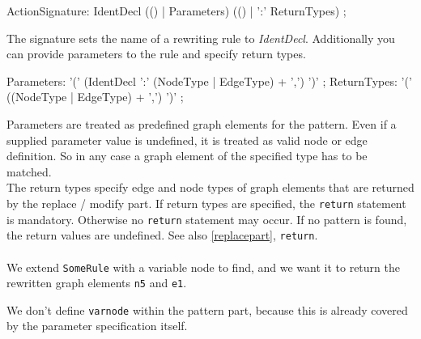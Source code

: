 \begin{rail}  
  ActionSignature: IdentDecl (() | Parameters) (() | ':' ReturnTypes) ;
\end{rail}
The signature sets the name of a rewriting rule to \emph{IdentDecl}. Additionally you can provide parameters to the rule and specify return types.

\begin{rail}
  Parameters: '(' (IdentDecl ':' (NodeType | EdgeType) + ',') ')' ;
  ReturnTypes: '(' ((NodeType | EdgeType) + ',') ')' ;
\end{rail}
Parameters are treated as predefined graph elements for the pattern. Even if a supplied parameter value is undefined, it is treated as valid node or edge definition. So in any case a graph element of the specified type has to be matched. \\
The return types specify edge and node types of graph elements that are returned by the replace / modify part. If return types are specified, the \texttt{return} statement is mandatory. Otherwise no \texttt{return} statement may occur. If no pattern is found, the return values are undefined. See also \ref{replacepart}, \texttt{return}.\\
{\\ \small We extend \texttt{SomeRule} with a variable node to find, and we want it to return the rewritten graph elements \texttt{n5} and \texttt{e1}.}
\begin{grgen}
  rule SomeRuleExt(varnode: Node): (Node, EdgeTypeB) {
    pattern{
      n1: NodeTypeA;
      ...
    }
    replace {
      varnode;
      ...  
      return(n5, e1);
      eval {
        ...
\end{grgen}
{\small We don't define \texttt{varnode} within the pattern part, because this is already covered by the parameter specification itself.\\}

